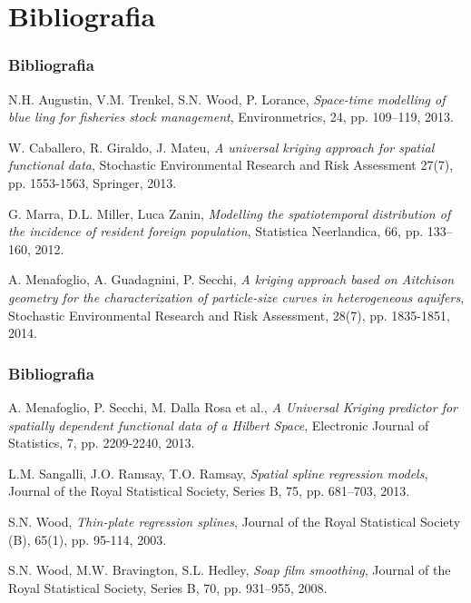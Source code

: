\documentclass[landscape,9pt]{beamer}                           %
\begin{document}
\section{Bibliografia}
\begin{frame}
\frametitle{Bibliografia}

N.H. Augustin, V.M. Trenkel, S.N. Wood, P. Lorance, \emph{Space-time modelling of blue ling for fisheries stock management}, Environmetrics, 24, pp. 109–119, 2013.
\par\bigskip
W. Caballero, R. Giraldo, J. Mateu, \emph{A universal kriging approach for spatial functional data}, Stochastic Environmental Research and Risk Assessment 27(7), pp. 1553-1563, Springer, 2013.
\par\bigskip
G. Marra, D.L. Miller, Luca Zanin, \emph{Modelling the spatiotemporal distribution of the incidence of resident foreign population}, Statistica Neerlandica, 66, pp. 133–160, 2012.
\par\bigskip
A. Menafoglio, A. Guadagnini, P. Secchi, \emph{A kriging approach based on Aitchison geometry for the characterization of particle-size curves in heterogeneous aquifers}, Stochastic Environmental Research and Risk Assessment, 28(7), pp. 1835-1851, 2014.
\par\bigskip
\begin{flushright}
[segue]
\end{flushright}
\end{frame}

\begin{frame}
\frametitle{Bibliografia}

A. Menafoglio, P. Secchi, M. Dalla Rosa et al., \emph{A Universal Kriging predictor for spatially dependent functional data of a Hilbert Space}, Electronic Journal of Statistics, 7, pp. 2209-2240, 2013.
\par\bigskip
L.M. Sangalli, J.O. Ramsay, T.O. Ramsay, \emph{Spatial spline regression models}, Journal of the Royal Statistical Society, Series B, 75, pp. 681–703, 2013.
\par\bigskip
S.N. Wood, \emph{Thin-plate regression splines}, Journal of the Royal Statistical Society (B), 65(1), pp. 95-114, 2003.
\par\bigskip
S.N. Wood, M.W. Bravington, S.L. Hedley, \emph{Soap film smoothing}, Journal of the Royal Statistical Society, Series B, 70, pp. 931–955, 2008.

\end{frame}
\end{document}

